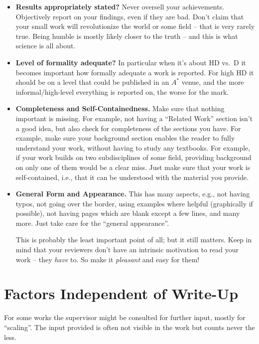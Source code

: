 \begin{itemize}
  \item \textbf{Results appropriately stated?} Never oversell your achievements. Objectively report on your findings, even if they are bad. Don't claim that your small work will revolutionize the world or some field -- that is very rarely true. Being humble is mostly likely closer to the truth -- and this is what science is all about.
  \item \textbf{Level of formality adequate?} In particular when it's about HD vs.\ D it becomes important how formally adequate a work is reported. For high HD it should be on a level that could be published in an $A^*$ venue, and the more informal/high-level everything is reported on, the worse for the mark.
  \item \textbf{Completeness and Self-Containedness.} Make sure that nothing important is missing. For example, not having a ``Related Work'' section isn't a good idea, but also check for completeness of the sections you have. For example, make sure your background section enables the reader to fully understand your work, without having to study any textbooks. For example, if your work builds on two subdisciplines of some field, providing background on only one of them would be a clear miss. Just make sure that your work is self-contained, i.e., that it can be understood with the material you provide.
  \item \textbf{General Form and Appearance.} This has many aspects, e.g., not having typos, not going over the border, using examples where helpful (graphically if possible), not having pages which are blank except a few lines, and many more. Just take care for the ``general appearance''.
  
  This is probably the least important point of all; but it still matters. Keep in mind that your reviewers don't have an intrinsic motivation to read your work -- they \emph{have} to. So make it \emph{pleasant} and easy for them!
\end{itemize}


\section{Factors Independent of Write-Up}

For some works the supervisor might be consulted for further input, mostly for ``scaling''. The input provided is often not visible in the work but counts never the less.

